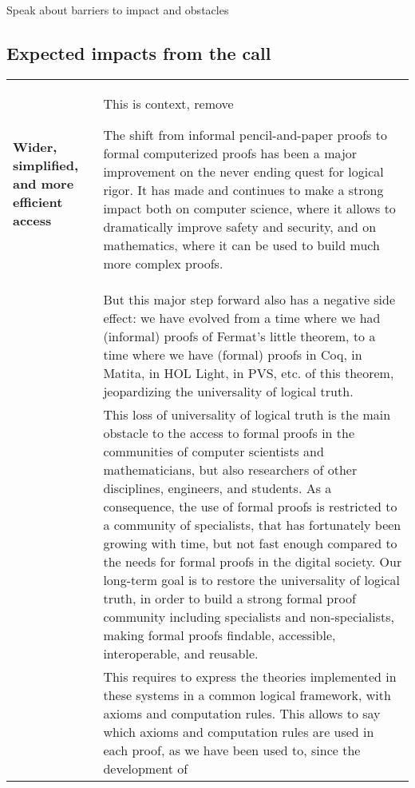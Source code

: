 {\color{red} Speak about barriers to impact and obstacles}

\subsection*{Expected impacts from the call}

\begin{longtable}{|p{}|p{}|}
\hline
{\bf Wider, simplified, and more efficient access}&

{\color{red} This is context, remove}

The shift from informal pencil-and-paper proofs to formal computerized
proofs has been a major improvement on the never ending quest for
logical rigor. It has made and continues to make a strong impact both
on computer science, where it allows to dramatically improve safety
and security, and on mathematics, where it can be used to build much
more complex proofs.\\
&
\hspace{0.4cm}
But this major step forward also has a negative side effect: we have
evolved from a time where we had (informal) proofs of Fermat's little
theorem, to a time where we have (formal) proofs in Coq, in Matita, in
HOL Light, in PVS, etc.  of this theorem, jeopardizing the
universality of logical truth.\\
&
\hspace*{0.4cm} This loss of universality of logical truth is the main
obstacle to the access to formal proofs in the communities of computer
scientists and mathematicians, but also researchers of other
disciplines, engineers, and students. As a consequence, the use of
formal proofs is restricted to a community of specialists, that has
fortunately been growing with time, but not fast enough
compared to the needs for formal proofs in the digital society.  Our
long-term goal is to restore the universality of logical truth, in
order to build a strong formal proof community including specialists
and non-specialists, making formal proofs findable, accessible,
interoperable, and reusable.\\ 
&
\hspace{0.4cm}
This requires to express the theories implemented in these systems in
a common logical framework, with axioms and computation rules. This allows
to say which axioms and computation rules are used in
each proof, as we have been used to, since the development of

\end{longtable}
